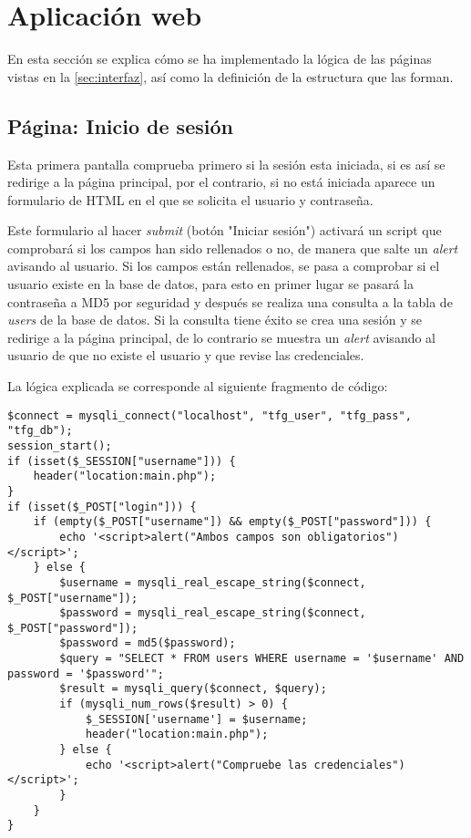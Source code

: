\section{Aplicación web}\label{sec:implAplicacion}
En esta sección se explica cómo se ha implementado la lógica de las páginas vistas en la \autoref{sec:interfaz}, así como la definición de la estructura que las forman.

\subsection{Página: Inicio de sesión}
Esta primera pantalla comprueba primero si la sesión esta iniciada, si es así se redirige a la página principal, por el contrario, si no está iniciada aparece un formulario de HTML en el que se solicita el usuario y contraseña. 

Este formulario al hacer \textit{submit} (botón "Iniciar sesión") activará un script que comprobará si los campos han sido rellenados o no, de manera que salte un \textit{alert} avisando al usuario. Si los campos están rellenados, se pasa a comprobar si el usuario existe en la base de datos, para esto en primer lugar se pasará la contraseña a MD5 por seguridad y después se realiza una consulta a la tabla de \textit{users} de la base de datos. Si la consulta tiene éxito se crea una sesión y se redirige a la página principal, de lo contrario se muestra un \textit{alert} avisando al usuario de que no existe el usuario y que revise las credenciales.

La lógica explicada se corresponde al siguiente fragmento de código:
\begin{lstlisting}
$connect = mysqli_connect("localhost", "tfg_user", "tfg_pass", "tfg_db");
session_start();
if (isset($_SESSION["username"])) {
    header("location:main.php");
}
if (isset($_POST["login"])) {
    if (empty($_POST["username"]) && empty($_POST["password"])) {
        echo '<script>alert("Ambos campos son obligatorios")</script>';
    } else {
        $username = mysqli_real_escape_string($connect, $_POST["username"]);
        $password = mysqli_real_escape_string($connect, $_POST["password"]);
        $password = md5($password);
        $query = "SELECT * FROM users WHERE username = '$username' AND password = '$password'";
        $result = mysqli_query($connect, $query);
        if (mysqli_num_rows($result) > 0) {
            $_SESSION['username'] = $username;
            header("location:main.php");
        } else {
            echo '<script>alert("Compruebe las credenciales")</script>';
        }
    }
}
\end{lstlisting}

